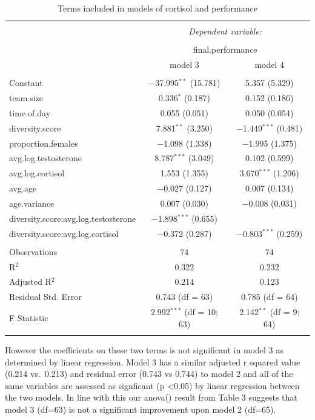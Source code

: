 \documentclass[]{article}
\begin{document}
\begin{table}[!htbp] \centering 
  \caption{Terms included in models of cortisol and performance} 
  \label{tab:regression} 
\small 
\begin{tabular}{@{\extracolsep{1pt}}lcc} 
\\[-1.8ex]\hline 
\hline \\[-1.8ex] 
 & \multicolumn{2}{c}{\textit{Dependent variable:}} \\ 
\cline{2-3} 
\\[-1.8ex] & \multicolumn{2}{c}{final.performance} \\ 
 & model 3 & model 4 \\ 
\hline \\[-1.8ex] 
 Constant & $-$37.995$^{**}$ (15.781) & 5.357 (5.329) \\ 
  team.size & 0.336$^{*}$ (0.187) & 0.152 (0.186) \\ 
  time.of.day & 0.055 (0.051) & 0.050 (0.054) \\ 
  diversity.score & 7.881$^{**}$ (3.250) & $-$1.449$^{***}$ (0.481) \\ 
  proportion.females & $-$1.098 (1.338) & $-$1.995 (1.375) \\ 
  avg.log.testosterone & 8.787$^{***}$ (3.049) & 0.102 (0.599) \\ 
  avg.log.cortisol & 1.553 (1.355) & 3.670$^{***}$ (1.206) \\ 
  avg.age & $-$0.027 (0.127) & 0.007 (0.134) \\ 
  age.variance & 0.007 (0.030) & $-$0.008 (0.031) \\ 
  diversity.score:avg.log.testosterone & $-$1.898$^{***}$ (0.655) &  \\ 
  diversity.score:avg.log.cortisol & $-$0.372 (0.287) & $-$0.803$^{***}$ (0.259) \\ 
 \hline \\[-1.8ex] 
Observations & 74 & 74 \\ 
R$^{2}$ & 0.322 & 0.232 \\ 
Adjusted R$^{2}$ & 0.214 & 0.123 \\ 
Residual Std. Error & 0.743 (df = 63) & 0.785 (df = 64) \\ 
F Statistic & 2.992$^{***}$ (df = 10; 63) & 2.142$^{**}$ (df = 9; 64) \\ 
\hline 
\hline \\[-1.8ex] 
\end{tabular} 
\end{table}

However the coefficients on these two terms is not significant in model
3 as determined by linear regression. Model 3 has a similar adjusted r
squared value (0.214 vs.~0.213) and residual error (0.743 vs 0.744) to
model 2 and all of the same variables are assessed as signficant (p
\textless{}0.05) by linear regression between the two models. In line
with this our anova() result from Table 3 suggests that model 3 (df=63)
is not a significant improvement upon model 2 (df=65).
\end{document}
